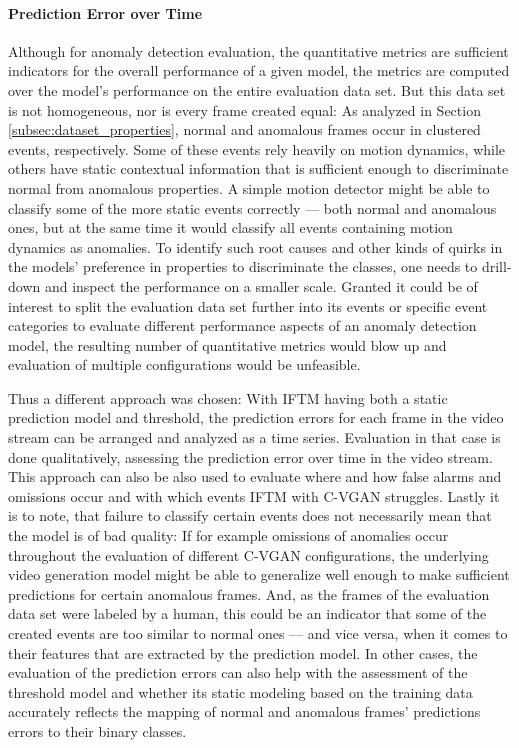 \paragraph{Prediction Error over Time}
Although for anomaly detection evaluation, the quantitative metrics are sufficient indicators for the overall performance of a given model, the metrics are computed over the model's performance on the entire evaluation data set. But this data set is not homogeneous, nor is every frame created equal: As analyzed in Section \ref{subsec:dataset_properties}, normal and anomalous frames occur in clustered events, respectively. Some of these events rely heavily on motion dynamics, while others have static contextual information that is sufficient enough to discriminate normal from anomalous properties. A simple motion detector might be able to classify some of the more static events correctly --- both normal and anomalous ones, but at the same time it would classify all events containing motion dynamics as anomalies. To identify such root causes and other kinds of quirks in the models' preference in properties to discriminate the classes, one needs to drill-down and inspect the performance on a smaller scale. Granted it could be of interest to split the evaluation data set further into its events or specific event categories to evaluate different performance aspects of an anomaly detection model, the resulting number of quantitative metrics would blow up and evaluation of multiple configurations would be unfeasible. 

Thus a different approach was chosen: With IFTM having both a static prediction model and threshold, the prediction errors for each frame in the video stream can be arranged and analyzed as a time series. Evaluation in that case is done qualitatively, assessing the prediction error over time in the video stream. This approach can also be also used to evaluate where and how false alarms and omissions occur and with which events IFTM with C-VGAN struggles. Lastly it is to note, that failure to classify certain events does not necessarily mean that the model is of bad quality: If for example omissions of anomalies occur throughout the evaluation of different C-VGAN configurations, the underlying video generation model might be able to generalize well enough to make sufficient predictions for certain anomalous frames. And, as the frames of the evaluation data set were labeled by a human, this could be an indicator that some of the created events are too similar to normal ones --- and vice versa, when it comes to their features that are extracted by the prediction model. In other cases, the evaluation of the prediction errors can also help with the assessment of the threshold model and whether its static modeling based on the training data accurately reflects the mapping of normal and anomalous frames' predictions errors to their binary classes. 


